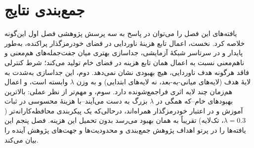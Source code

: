 \section{جمع‌بندی نتایج}
یافته‌های این فصل را می‌توان در پاسخ به سه پرسش پژوهشی فصل اول این‌گونه خلاصه کرد. نخست، اعمال تابع هزینهٔ ناوردایی در فضای خودرمزگذار پراکنده، به‌طور پایدار و در سرتاسر شبکهٔ آزمایشی، جداسازی بهتری میان جفت‌جمله‌های هم‌معنی و ناهم‌معنی نسبت به اعمال همان تابع هزینه در فضای خام تولید می‌کند؛ شرط کنترلی فاقد هرگونه هدف ناوردایی، هیچ بهبودی نشان نمی‌دهد. دوم، این جداسازی به‌شدت به لایهٔ هدف (لایه‌های میانی-به-بعد، نه لایه‌های ابتدایی) و به وزن
$\lambda$
وابسته است، و اعمال هم‌زمان چند لایه اثری فراجمع‌شونده دارد. سوم، و مهم‌تر از نظر عملی: بالاترین بهبودهای خام--که همگی در
$\lambda$
بزرگ به دست می‌آیند--با هزینهٔ محسوسی در ثبات آموزش و در اعتبار خودرمزگذار همراه‌اند، درحالی‌که یک پیکربندی محافظه‌کارانه‌تر
($\lambda=0.3$، تک‌لایه) تقریباً به همان بهبود می‌رسد بدون تحمیل این هزینه. فصل پنجم این یافته‌ها را در پرتو اهداف پژوهش جمع‌بندی و محدودیت‌ها و جهت‌های پژوهش آینده را بیان می‌کند.
